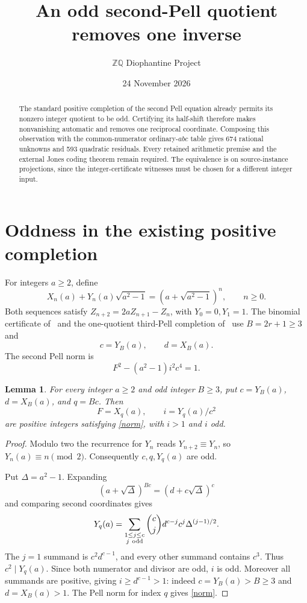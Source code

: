 \documentclass[11pt]{article}
\title{An odd second-Pell quotient removes one inverse}
\author{\(\mathbb Z\mathbb Q\) Diophantine Project}
\date{24 November 2026}
\newtheorem{lemma}[theorem]{Lemma}
\begin{document}
\maketitle
\begin{abstract}
The standard positive completion of the second Pell equation already
permits its nonzero integer quotient to be odd. Certifying its half-shift
therefore makes nonvanishing automatic and removes one reciprocal
coordinate. Composing this observation with the common-numerator
ordinary-\(abc\) table gives 674 rational unknowns and 593 quadratic
residuals. Every retained arithmetic premise and the external Jones
coding theorem remain required. The equivalence is on source-instance
projections, since the integer-certificate witnesses must be chosen for
a different integer input.
\end{abstract}

\section{Oddness in the existing positive completion}

For integers \(a\ge2\), define
\[
 X_n(a)+Y_n(a)\sqrt{a^2-1}
       =(a+\sqrt{a^2-1})^n,\qquad n\ge0.
\]
Both sequences satisfy \(Z_{n+2}=2aZ_{n+1}-Z_n\), with
\(Y_0=0,Y_1=1\). The binomial certificate of~\cite{Binomial}
and the one-quotient third-Pell completion of~\cite{CRT} use
\(B=2r+1\ge3\) and
\[
              c=Y_B(a),\qquad d=X_B(a).
\]
The second Pell norm is
\begin{equation}\label{norm}
                F^2-(a^2-1)i^2c^4=1.
\end{equation}

\begin{lemma}\label{odd}
For every integer \(a\ge2\) and odd integer \(B\ge3\), put
\(c=Y_B(a)\), \(d=X_B(a)\), and \(q=Bc\). Then
\[
 F=X_q(a),\qquad i=Y_q(a)/c^2
\]
are positive integers satisfying \eqref{norm}, with \(i>1\)
and \(i\) odd.
\end{lemma}
\begin{proof}
Modulo two the recurrence for \(Y_n\) reads
\(Y_{n+2}\equiv Y_n\), so \(Y_n(a)\equiv n\pmod2\).
Consequently \(c,q,Y_q(a)\) are odd.

Put \(\Delta=a^2-1\). Expanding
\[
 (a+\sqrt\Delta)^{Bc}=(d+c\sqrt\Delta)^c
\]
and comparing second coordinates gives
\[
 Y_q(a)=\sum_{\substack{1\le j\le c\\j\ {
\rm odd}}}
       \binom cj d^{c-j}c^j\Delta^{(j-1)/2}.
\]
The \(j=1\) summand is \(c^2d^{c-1}\), and every other
summand contains \(c^3\). Thus \(c^2\mid Y_q(a)\).
Since both numerator and divisor are odd, \(i\) is odd.
Moreover all summands are positive, giving
\(i\ge d^{c-1}>1\): indeed \(c=Y_B(a)>B\ge3\) and
\(d=X_B(a)>1\). The Pell norm for index \(q\) gives
\eqref{norm}.
\end{proof}
\end{document}
